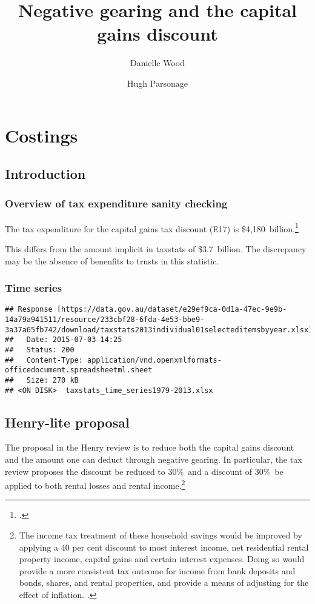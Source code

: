 \documentclass{grattan}\usepackage[]{graphicx}\usepackage[]{color}
\title{Negative gearing and the capital gains discount}
\author{Danielle Wood \and Hugh Parsonage}
\makeatletter
\newenvironment{kframe}{%
 \def\at@end@of@kframe{}%
 \ifinner\ifhmode%
  \def\at@end@of@kframe{\end{minipage}}%
  \begin{minipage}{\columnwidth}%
 \fi\fi%
 \def\FrameCommand##1{\hskip\@totalleftmargin \hskip-\fboxsep
 \colorbox{shadecolor}{##1}\hskip-\fboxsep
     \hskip-\linewidth \hskip-\@totalleftmargin \hskip\columnwidth}%
 \MakeFramed {\advance\hsize-\width
   \@totalleftmargin\z@ \linewidth\hsize
   \@setminipage}}%
 {\par\unskip\endMakeFramed%
 \at@end@of@kframe}
\newenvironment{knitrout}{}{} %
\makeatother
\begin{document}
\clearpage





\raggedbottom
\contentspage
\listoffigures
\listoftables

\chapter{Costings}
\section{Introduction}
\subsection{Overview of tax expenditure sanity checking}
The tax expenditure for the capital gains tax discount (E17) is \$4,180~billion.\footcite{TaxExpenditures201213} 


This differs from the amount implicit in taxstats of \$3.7~billion. The discrepancy may be the absence of benenfits to trusts in this statistic. 

\subsection{Time series}
\begin{knitrout}
\color{fgcolor}\begin{kframe}
\begin{verbatim}
## Response [https://data.gov.au/dataset/e29ef9ca-0d1a-47ec-9e9b-14a79a941511/resource/233cbf28-6fda-4e53-bbe9-3a37a65fb742/download/taxstats2013individual01selecteditemsbyyear.xlsx]
##   Date: 2015-07-03 14:25
##   Status: 200
##   Content-Type: application/vnd.openxmlformats-officedocument.spreadsheetml.sheet
##   Size: 270 kB
## <ON DISK>  taxstats_time_series1979-2013.xlsx
\end{verbatim}
\end{kframe}
\end{knitrout}

\section{Henry-lite proposal}
The proposal in the Henry review is to reduce both the capital gains discount and the amount one can deduct through negative gearing. In particular, the tax review proposes the discount be reduced to 30\%\ and a discount of 30\%\ be applied to both rental losses and rental income.\footnote{The income tax treatment of these household savings would be improved by applying a
40 per cent discount to most interest income, net residential rental property income, capital
gains and certain interest expenses. Doing so would provide a more consistent tax
outcome for income from bank deposits and bonds, shares, and rental properties, and
provide a means of adjusting for the effect of inflation. \textcite{Treasury2010a}.}
\end{document}
